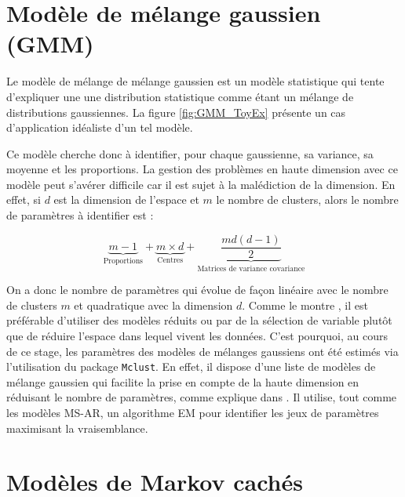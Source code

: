 \documentclass[12pt, french]{report}
\begin{document}
\section{Modèle de mélange gaussien (GMM)}
\label{sec:Model_GMM}
Le modèle de mélange de mélange gaussien est un modèle statistique qui tente d'expliquer une une distribution statistique comme étant un mélange de distributions gaussiennes. La figure \ref{fig:GMM_ToyEx} présente un cas d'application idéaliste d'un tel modèle. 




Ce modèle cherche donc à identifier, pour chaque gaussienne, sa variance, sa moyenne et les proportions. La gestion des problèmes en haute dimension avec ce modèle peut s'avérer difficile car il est sujet à la malédiction de la dimension. En effet, si $d$ est la dimension de l'espace et $m$ le nombre de clusters, alors le nombre de paramètres à identifier est :

\begin{equation}
\underbrace{m-1}_\text{Proportions}  + \underbrace{m \times d}_\text{Centres}  +  \underbrace{\frac{md \left(d - 1\right)}{2}}_\text{Matrices de variance covariance}
\label{eq:Model_GMM_ParamNumber} 
\end{equation}

On a donc le nombre de paramètres qui évolue de façon linéaire avec le nombre de clusters $m$ et quadratique avec la dimension $d$. Comme le montre \cite{bouveyron_model-based_2014}, il est préférable d'utiliser des modèles réduits ou par de la sélection de variable plutôt que de réduire l'espace dans lequel vivent les données. C'est pourquoi, au cours de ce stage, les paramètres des modèles de mélanges gaussiens ont été estimés via l'utilisation du package \texttt{Mclust}. En effet, il dispose d'une liste de modèles de mélange gaussien qui facilite la prise en compte de la haute dimension en réduisant le nombre de paramètres, comme explique dans \cite{scrucca_mclust_2016}. Il utilise, tout comme les modèles MS-AR, un algorithme EM pour identifier les jeux de paramètres maximisant la vraisemblance.  

\section{Modèles de Markov cachés}
\end{document}

